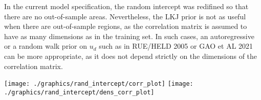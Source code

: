 In the current model specification, the random intercept was redifined so that there are no out-of-sample areas.
Nevertheless, the LKJ prior is not as useful when there are out-of-sample regions, as the correlation matrix is assumed to have as many dimensions as in the training set.
In such cases, an autoregressive or a random walk prior on $u_d$ such as in RUE/HELD 2005 or GAO et AL 2021 can be more appropriate, as it does not depend strictly on the dimensions of the correlation matrix.


\texttt{[image: ./graphics/rand\_intercept/corr\_plot]}
\texttt{[image: ./graphics/rand\_intercept/dens\_corr\_plot]}






